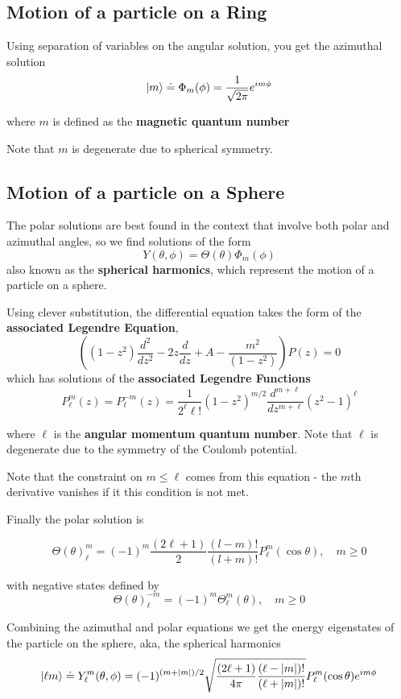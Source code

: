 \documentclass{article}
\begin{document}
\subsection{Motion of a particle on a Ring}
Using separation of variables on the angular solution, you get the azimuthal solution
$$
\ket{m} \doteq \Phi_m(\phi) = \frac{1}{\sqrt{2\pi}}e^{im\phi}
$$

where $m$ is defined as the \textbf{magnetic quantum number}

Note that $m$ is degenerate due to spherical symmetry.

\subsection{Motion of a particle on a Sphere}
The polar solutions are best found in the context that involve both polar and azimuthal angles, so we find solutions of the form 
$$Y(\theta,\phi) = \Theta(\theta) \Phi_m(\phi)$$
also known as the \textbf{spherical harmonics}, which represent the motion of a particle on a sphere.

Using clever substitution, the differential equation takes the form of the \textbf{associated Legendre Equation},
$$
\left( (1-z^2) \frac{d^2}{dz^2} - 2z \frac{d}{dz} + A - \frac{m^2}{(1-z^2)} \right) P(z) = 0
$$
which has solutions of the \textbf{associated Legendre Functions}
$$
P^m_\ell(z) = P^{-m}_\ell(z) = \frac{1}{2^\ell \ell!}(1-z^2)^{m/2}\frac{d^{m+\ell}}{dz^{m+\ell}} (z^2 - 1)^\ell
$$

where $\ell$ is the \textbf{angular momentum quantum number}. Note that $\ell$ is degenerate due to the symmetry of the Coulomb potential.

Note that the constraint on $m\leq \ell$ comes from this equation - the $m$th derivative vanishes if it this condition is not met.

Finally the polar solution is 

$$
\Theta(\theta)^{m}_{\ell} = (-1)^m \frac{(2\ell + 1)}{2} \frac{(l-m)!}{(l+m)!} P^{m}_{\ell}(\cos\theta), \quad m \geq 0
$$

with negative states defined by 
$$
\Theta(\theta)^{-m}_{\ell} = (-1)^m \Theta^m_\ell(\theta), \quad m \geq 0
$$

Combining the azimuthal and polar equations we get the energy eigenstates of the particle on the sphere, aka, the spherical harmonics
$$
\ket{\ell m} \doteq Y^m_\ell(\theta,\phi) = (-1)^{(m+\abs{m})/2} \sqrt{\frac{(2\ell+1)}{4\pi} \frac{(\ell - \abs{m})!}{(\ell + \abs{m})!}} P^m_\ell(\cos\theta)e^{im\phi}
$$
\end{document}
